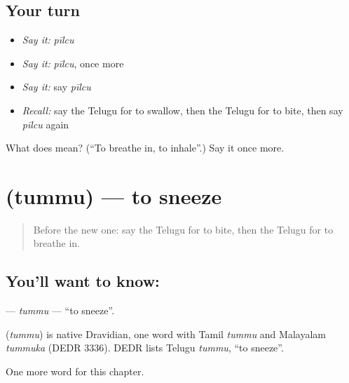 \subsection*{Your turn}
\begin{itemize}
\raggedright
  \item \emph{Say it:} \emph{pīlcu}
  \item \emph{Say it:} \emph{pīlcu}, once more
  \item \emph{Say it:} say \emph{pīlcu}
  \item \emph{Recall:} say the Telugu for to swallow, then the Telugu for to bite, then say \emph{pīlcu} again
\end{itemize}

\begin{tcolorbox}[breakable,colback=teal!4,colframe=teal!35!black,title={Before you move on}]
What does  mean? (\textquotedblleft{}To breathe in, to inhale\textquotedblright{}.) Say it once more.
\end{tcolorbox}
\section[\texorpdfstring{\te{తుమ్ము} (tummu)}{తుమ్ము (tummu)}]{ (tummu) — to sneeze}

\label{lesson:TE-C241-tummu}



\begin{quote}
Before the new one: say the Telugu for to bite, then the Telugu for to breathe in.
\end{quote}

\subsection*{You'll want to know: }
\textbf{} — \emph{tummu} — \textquotedblleft{}to sneeze\textquotedblright{}.

\begin{cousinweb}
\textbf{} (\emph{tummu}) is native Dravidian, one word with Tamil \emph{tummu} and Malayalam \emph{tummuka} (DEDR 3336). DEDR lists Telugu \emph{tummu}, \textquotedblleft{}to sneeze\textquotedblright{}.
\end{cousinweb}

\begin{grammarlens}[title={What you've built}]
One more word for this chapter.
\end{grammarlens}

